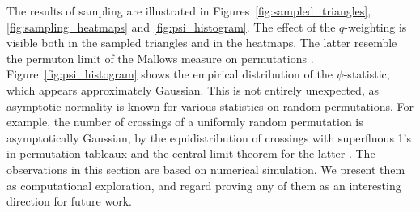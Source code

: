 \documentclass[pdftex]{sigma}
\numberwithin{equation}{section}
\theoremstyle{definition}
\begin{document}
The results of sampling are illustrated in
Figures~\ref{fig:sampled_triangles}, \ref{fig:sampling_heatmaps} and \ref{fig:psi_histogram}.
The effect of the $q$-weighting is visible both in the sampled triangles and in
the heatmaps.
The latter resemble the permuton limit of the Mallows measure on permutations
\cite{Starr2009}.
Figure~\ref{fig:psi_histogram} shows the empirical distribution of the
$\psi$-statistic, which appears approximately Gaussian.
This is not entirely unexpected, as asymptotic normality is known for various
statistics on random permutations. For example, the number of crossings of a
uniformly random permutation is asymptotically Gaussian, by the
equidistribution of crossings with superfluous 1's in permutation tableaux
\cite{Corteel2007crossings} and the central limit theorem for the latter
\cite{HitczenkoJanson2010}.
The observations in this section are based on numerical simulation. We present
them as computational exploration, and regard proving any of them as an
interesting direction for future work.
\end{document}
